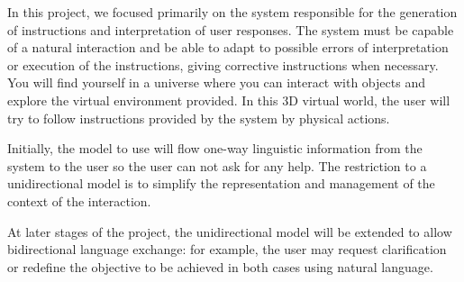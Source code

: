 
% 

In this project, we focused primarily on the system responsible for the
generation of instructions and interpretation of user responses. The system must
be capable of
a natural interaction and be able to adapt to possible errors of interpretation
or execution of the instructions, giving corrective instructions when necessary.
You will find yourself in a universe where you can interact with objects and
explore the virtual environment provided. In this 3D virtual world, the user
will try to follow instructions provided by the system by physical actions.


Initially, the model to use will flow one-way linguistic information from the
system to the user so the user can not ask for any help. The restriction to a
unidirectional model is to simplify the representation and management of the
context of the interaction.


At later stages of the project, the unidirectional model will be extended to
allow bidirectional language exchange: for example, the user may request
clarification or redefine the objective to be achieved in both cases using
natural language.

